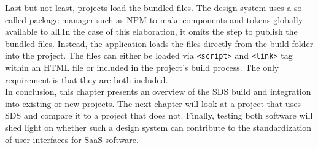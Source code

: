 Last but not least, projects load the bundled files. The design system uses a so-called package manager such as \acl{NPM} to make components and tokens globally available to all.In the case of this elaboration, it omits the step to publish the bundled files. Instead, the application loads the files directly from the build folder into the project. The files can either be loaded via \texttt{<script>} and \texttt{<link>} tag within an \ac{HTML} file or included in the project's build process. The only requirement is that they are both included. \\
In conclusion, this chapter presents an overview of the \ac{SDS} build and integration into existing or new projects. The next chapter will look at a project that uses \ac{SDS} and compare it to a project that does not. Finally, testing both software will shed light on whether such a design system can contribute to the standardization of user interfaces for \ac{SaaS} software. 